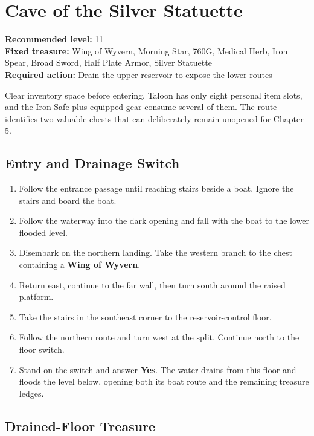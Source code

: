 \documentclass[
  american,
  10pt,
  letterpaper,
  oneside,
  open=any]{scrreprt}
\providecommand{\tightlist}{%
  \setlength{\itemsep}{0pt}\setlength{\parskip}{0pt}}
\begin{document}
\section{Cave of the Silver
Statuette}\label{cave-of-the-silver-statuette}

\textbf{Recommended level:} 11\\
\textbf{Fixed treasure:} Wing of Wyvern, Morning Star, 760G, Medical
Herb, Iron Spear, Broad Sword, Half Plate Armor, Silver Statuette\\
\textbf{Required action:} Drain the upper reservoir to expose the lower
routes

Clear inventory space before entering. Taloon has only eight personal
item slots, and the Iron Safe plus equipped gear consume several of
them. The route identifies two valuable chests that can deliberately
remain unopened for Chapter 5.

\subsection{Entry and Drainage Switch}\label{entry-and-drainage-switch}

\begin{enumerate}
\def\labelenumi{\arabic{enumi}.}
\tightlist
\item
  Follow the entrance passage until reaching stairs beside a boat.
  Ignore the stairs and board the boat.
\item
  Follow the waterway into the dark opening and fall with the boat to
  the lower flooded level.
\item
  Disembark on the northern landing. Take the western branch to the
  chest containing a \textbf{Wing of Wyvern}.
\item
  Return east, continue to the far wall, then turn south around the
  raised platform.
\item
  Take the stairs in the southeast corner to the reservoir-control
  floor.
\item
  Follow the northern route and turn west at the split. Continue north
  to the floor switch.
\item
  Stand on the switch and answer \textbf{Yes}. The water drains from
  this floor and floods the level below, opening both its boat route and
  the remaining treasure ledges.
\end{enumerate}

\subsection{Drained-Floor Treasure}\label{drained-floor-treasure}
\end{document}
